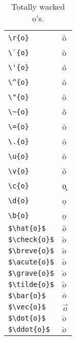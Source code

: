 \documentclass{article}
\begin{document}
\begin{table}
\begin{center}
\begin{tabular}{ll}
\verb#\r{o}#& \r{o}\\
\verb#\`{o}#& \`{o}\\
\verb#\'{o}#& \'{o}\\
\verb#\^{o}#& \^{o}\\
\verb#\"{o}#& \"{o}\\
\verb#\~{o}#& \~{o}\\
\verb#\={o}#& \={o}\\
\verb#\.{o}#& \.{o}\\
\verb#\u{o}#& \u{o}\\
\verb#\v{o}#& \v{o}\\
\verb#\c{o}#& \c{o}\\
\verb#\d{o}#& \d{o}\\
\verb#\b{o}#& \b{o}\\
\verb#$\hat{o}$#& $\hat{o}$\\
\verb#$\check{o}$#& $\check{o}$\\
\verb#$\breve{o}$#& $\breve{o}$\\
\verb#$\acute{o}$#& $\acute{o}$\\
\verb#$\grave{o}$#& $\grave{o}$\\
\verb#$\tilde{o}$#& $\tilde{o}$\\
\verb#$\bar{o}$#& $\bar{o}$\\
\verb#$\vec{o}$#& $\vec{o}$\\
\verb#$\dot{o}$#& $\dot{o}$\\
\verb#$\ddot{o}$#& $\ddot{o}$\\
\end{tabular}
\caption{Totally wacked o's.}
\end{center}
\end{table}
\end{document}
